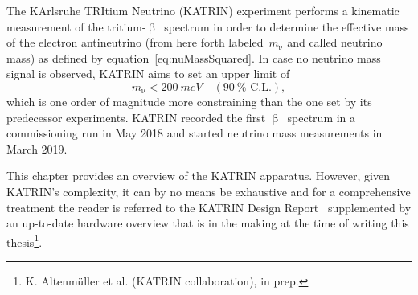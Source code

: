 The KArlsruhe TRItium Neutrino (KATRIN) experiment performs a kinematic measurement of the tritium-$\upbeta$~spectrum in order to determine the effective mass of the electron antineutrino (from here forth labeled~$m_\upnu$ and called neutrino mass) as defined by equation~\eqref{eq:nuMassSquared}. In case no neutrino mass signal is observed, KATRIN aims to set an upper limit of
\begin{equation*}
m_\upnu < \SI{200}{meV} \quad (\SI{90}{\percent} \text{ C.L.})
\comma
\end{equation*}
which is one order of magnitude more constraining than the one set by its predecessor experiments.
KATRIN recorded the first $\upbeta$~spectrum in a commissioning run in May 2018 and started neutrino mass measurements in March 2019.

This chapter provides an overview of the KATRIN apparatus. However, given KATRIN's complexity, it can by no means be exhaustive and for a comprehensive treatment the reader is referred to the KATRIN Design Report~\cite{Angrik:2005ep} supplemented by an up-to-date hardware overview that is in the making at the time of writing this thesis\footnote{K. Altenmüller et al. (KATRIN collaboration), in prep.}.